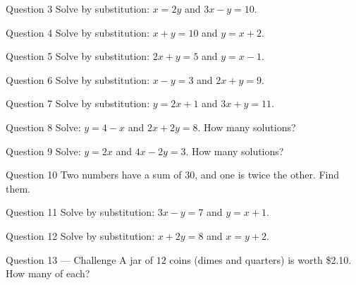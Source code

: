 \documentclass[11pt]{article}
\begin{document}
\begin{qbox}{Question 3}
Solve by substitution: $x=2y$ and $3x-y=10$.\workspace{2.4cm}
\end{qbox}

\begin{qbox}{Question 4}
Solve by substitution: $x+y=10$ and $y=x+2$.\workspace{2.4cm}
\end{qbox}

\begin{qbox}{Question 5}
Solve by substitution: $2x+y=5$ and $y=x-1$.\workspace{2.4cm}
\end{qbox}

\begin{qbox}{Question 6}
Solve by substitution: $x-y=3$ and $2x+y=9$.\workspace{2.6cm}
\end{qbox}

\begin{qbox}{Question 7}
Solve by substitution: $y=2x+1$ and $3x+y=11$.\workspace{2.4cm}
\end{qbox}

\begin{qbox}{Question 8}
Solve: $y=4-x$ and $2x+2y=8$. How many solutions?\workspace{2.4cm}
\end{qbox}

\begin{qbox}{Question 9}
Solve: $y=2x$ and $4x-2y=3$. How many solutions?\workspace{2.4cm}
\end{qbox}

\begin{qbox}{Question 10}
Two numbers have a sum of $30$, and one is twice the other. Find them.\workspace{2.6cm}
\end{qbox}

\begin{qbox}{Question 11}
Solve by substitution: $3x-y=7$ and $y=x+1$.\workspace{2.4cm}
\end{qbox}

\begin{qbox}{Question 12}
Solve by substitution: $x+2y=8$ and $x=y+2$.\workspace{2.6cm}
\end{qbox}

\begin{qbox}{Question 13 --- Challenge}
A jar of $12$ coins (dimes and quarters) is worth \$2.10. How many of each?\workspace{3.2cm}
\end{qbox}

\clearpage
{}
\end{document}
